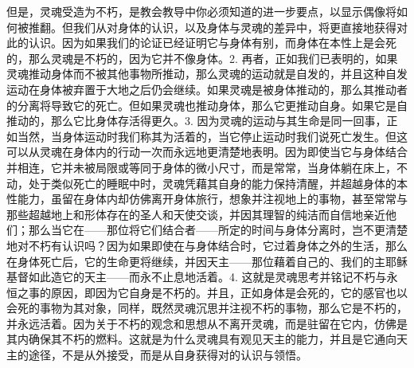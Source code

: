 \par

但是，灵魂受造为不朽，是教会教导中你必须知道的进一步要点，以显示偶像将如何被推翻。但我们从对身体的认识，以及身体与灵魂的差异中，将更直接地获得对此的认识。因为如果我们的论证已经证明它与身体有别，而身体在本性上是会死的，那么灵魂是不朽的，因为它并不像身体。2. 再者，正如我们已表明的，如果灵魂推动身体而不被其他事物所推动，那么灵魂的运动就是自发的，并且这种自发运动在身体被弃置于大地之后仍会继续。如果灵魂是被身体推动的，那么其推动者的分离将导致它的死亡。但如果灵魂也推动身体，那么它更推动自身。如果它是自推动的，那么它比身体存活得更久。3. 因为灵魂的运动与其生命是同一回事，正如当然，当身体运动时我们称其为活着的，当它停止运动时我们说死亡发生。但这可以从灵魂在身体内的行动一次而永远地更清楚地表明。因为即使当它与身体结合并相连，它并未被局限或等同于身体的微小尺寸，而是常常，当身体躺在床上，不动，处于类似死亡的睡眠中时，灵魂凭藉其自身的能力保持清醒，并超越身体的本性能力，虽留在身体内却仿佛离开身体旅行，想象并注视地上的事物，甚至常常与那些超越地上和形体存在的圣人和天使交谈，并因其理智的纯洁而自信地亲近他们；那么当它在——那位将它们结合者——所定的时间与身体分离时，岂不更清楚地对不朽有认识吗？因为如果即使在与身体结合时，它过着身体之外的生活，那么在身体死亡后，它的生命更将继续，并因天主——那位藉着自己的、我们的主耶稣基督如此造它的天主——而永不止息地活着。4. 这就是灵魂思考并铭记不朽与永恒之事的原因，即因为它自身是不朽的。并且，正如身体是会死的，它的感官也以会死的事物为其对象，同样，既然灵魂沉思并注视不朽的事物，那么它是不朽的，并永远活着。因为关于不朽的观念和思想从不离开灵魂，而是驻留在它内，仿佛是其内确保其不朽的燃料。这就是为什么灵魂具有观见天主的能力，并且是它通向天主的途径，不是从外接受，而是从自身获得对的认识与领悟。\par

\par

